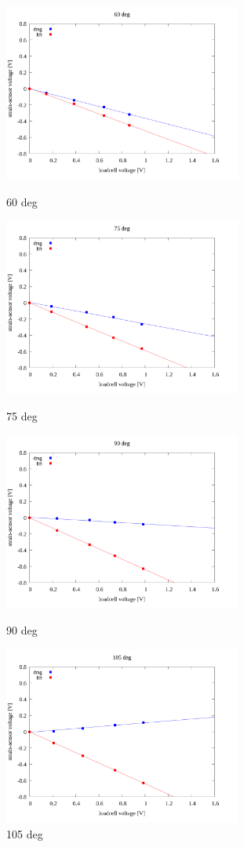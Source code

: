 \documentclass[twocolumn,a4j]{jsarticle}
\begin{document}
\par
\newpage

\begin{figure}[htbp]
    \footnotesize
    \begin{center}
        \includegraphics[width=78mm]{../images/linear/60_linear.png}
        \caption{60 deg}
        \includegraphics[width=78mm]{../images/linear/75_linear.png}
        \caption{75 deg}
        \includegraphics[width=78mm]{../images/linear/90_linear.png}
        \caption{90 deg}
        \includegraphics[width=78mm]{../images/linear/105_linear.png}
        \caption{105 deg}
    \end{center}
\end{figure}
\end{document}

